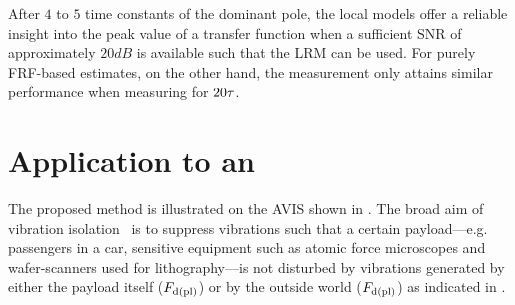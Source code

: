 \begin{guideline}
\begin{minipage}{0.725\textwidth}
After $4$ to $5$ time constants of the dominant pole, the local models offer a reliable insight into the peak value of a transfer function when a sufficient \gls{SNR} of approximately $20\unit{dB}$ is available such that the \gls{LRM} can be used.
For purely \gls{FRF}-based estimates, on the other hand, the measurement only attains similar performance when measuring for $20\tau_{}$.
\end{minipage}
\hfill
\begin{minipage}{0.25\textwidth}
\setlength\figurewidth{\columnwidth}
\setlength\figureheight{0.618\figurewidth}

\end{minipage}
\end{guideline}

\section{Application to an }
\label{sec:lrmhinf:measurement}
The proposed method is illustrated on the \gls{AVIS} shown in .
The broad aim of vibration isolation~\citep{Karnopp1995,Collette2011} is to suppress vibrations such that a certain payload---e.g. passengers in a car, sensitive equipment such as atomic force microscopes and wafer-scanners used for lithography---is not disturbed by vibrations generated by either the payload itself ($F_{\mathrm{d(pl)}}$) or by the outside world ($F_{\mathrm{d(pl)}}$) as indicated in .

